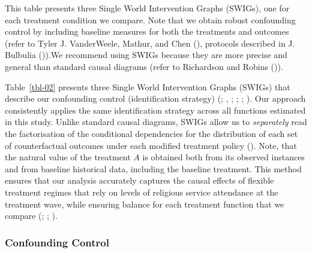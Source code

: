 \documentclass[
  single column]{article}
\begin{document}
\begin{table}

\caption{\label{tbl-02}This table presents three Single World
Intervention Graphs (SWIGs), one for each treatment condition we
compare. Note that we obtain robust confounding control by including
baseline measures for both the treatments and outcomes (refer to Tyler
J. VanderWeele, Mathur, and Chen (),
protocols described in J. Bulbulia
()).We recommend using SWIGs
because they are more precise and general than standard causal diagrams
(refer to Richardson and Robins
()).}

\centering{

\lmtptablethree

}

\end{table}%

Table~\ref{tbl-02} presents three Single World Intervention Graphs
(SWIGs) that describe our confounding control (identification strategy)
(;
,
;
; ;
). Our
approach consistently applies the same identification strategy across
all functions estimated in this study. Unlike standard causal diagrams,
SWIGs allow us to \emph{separately} read the factorisation of the
conditional dependencies for the distribution of each set of
counterfactual outcomes under each modified treatment policy
().
Note, that the natural value of the treatment \(A\) is obtained both
from its observed instances and from baseline historical data, including
the baseline treatment. This method ensures that our analysis accurately
captures the causal effects of flexible treatment regimes that rely on
levels of religious service attendance at the treatment wave, while
ensuring balance for each treatment function that we compare
(;
;
).

\subsubsection{Confounding Control}\label{confounding-control}
\end{document}
